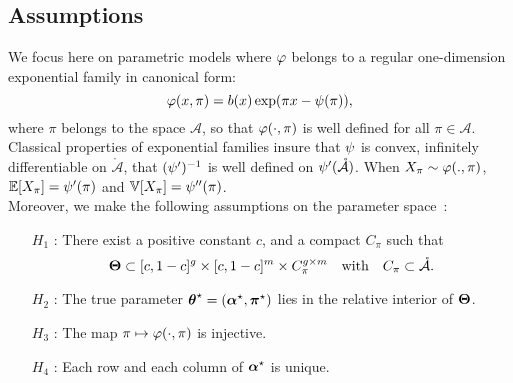 \documentclass[]{imsart}
\newcommand{\1}{\mathds{1}}
\numberwithin{equation}{section}
\theoremstyle{plain}
\theoremstyle{remark}
\newtheorem{rem}[thm]{Remark}
\begin{document}
\subsection{Assumptions}\label{sec:assumptions}
We focus here on parametric models where $\varphi$ belongs to a regular one-dimension exponential family in canonical form:
\begin{equation}
  \dens(x, \pi) = b(x)\exp(\pi x - \norm(\pi)),
\end{equation}
where $\pi$ belongs to the space  $\mathcal{A}$, so that $\varphi(\cdot, \pi)$ is well defined for all $\pi \in \mathcal{A}$. Classical properties of exponential families insure that $\psi$ is convex, infinitely differentiable on $\mathring{\mathcal{A}}$, that $(\psi')^{-1}$ is well defined on $\psi'(\mathring{\mathcal{A}})$. When $X_{\pi} \sim \varphi(., \pi)$, $\mathbb{E}[X_\pi] = \psi'(\pi)$ and $\mathbb{V}[X_{\pi}] = \psi''(\pi)$. \\

Moreover, we make the following assumptions on the parameter space~:
\begin{enumerate}
\item[$H_1$]: There exist a positive constant $c$, and a compact $C_\pi$ such that 
  \begin{equation*}
    \bTheta \subset [c, 1-c]^{\g} \times  [c, 1-c]^{\m} \times C_{\pi}^{\g \times \m} \quad \text{with} \quad C_\pi \subset \mathring{\mathcal{A}}.
  \end{equation*}
\item[$H_2$]: The true parameter $\boldsymbol{\theta}^\star = (\boldsymbol{\alpha}^\star, \boldsymbol{\pi}^\star)$ lies in the relative interior of $\boldsymbol{\Theta}$.
\item[$H_3$]: The map $\pi \mapsto \varphi(\cdot, \pi)$ is injective.
\item[$H_4$]: 
Each row and each column of $\boldsymbol{\alpha}^\star$ is unique.
\end{enumerate}
\end{document}
